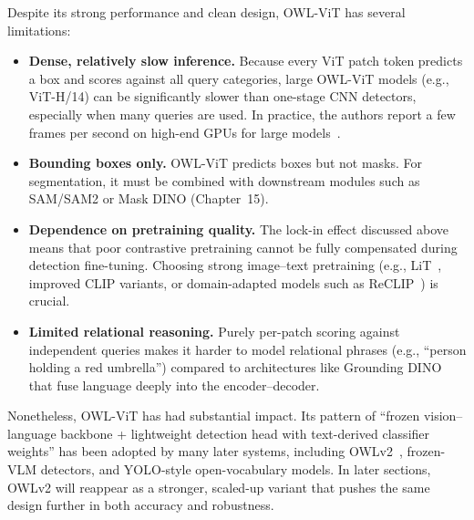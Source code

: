 \begin{enrichment}
	\begin{enrichment}
		Despite its strong performance and clean design, OWL-ViT has several limitations:
		\begin{itemize}
			\item \textbf{Dense, relatively slow inference.}
			Because every ViT patch token predicts a box and scores against all query categories, large OWL-ViT models (e.g., ViT-H/14) can be significantly slower than one-stage CNN detectors, especially when many queries are used.
			In practice, the authors report a few frames per second on high-end GPUs for large models~\cite{minderer2022_owlvit}.
			\item \textbf{Bounding boxes only.}
			OWL-ViT predicts boxes but not masks.
			For segmentation, it must be combined with downstream modules such as SAM/SAM2 or Mask DINO (Chapter~15).
			\item \textbf{Dependence on pretraining quality.}
			The lock-in effect discussed above means that poor contrastive pretraining cannot be fully compensated during detection fine-tuning.
			Choosing strong image--text pretraining (e.g., LiT~\cite{zhai2022_lit}, improved CLIP variants, or domain-adapted models such as ReCLIP~\cite{hu2023_reclip}) is crucial.
			\item \textbf{Limited relational reasoning.}
			Purely per-patch scoring against independent queries makes it harder to model relational phrases (e.g., ``person holding a red umbrella'') compared to architectures like Grounding DINO that fuse language deeply into the encoder--decoder.
		\end{itemize}
		
		Nonetheless, OWL-ViT has had substantial impact.
		Its pattern of ``frozen vision--language backbone + lightweight detection head with text-derived classifier weights'' has been adopted by many later systems, including OWLv2~\cite{minderer2024_owlvitv2}, frozen-VLM detectors, and YOLO-style open-vocabulary models.
		In later sections, OWLv2 will reappear as a stronger, scaled-up variant that pushes the same design further in both accuracy and robustness.		
	\end{enrichment}
	
\end{enrichment}

\newpage


